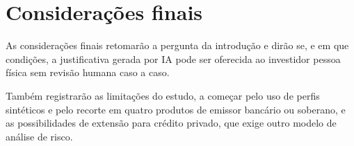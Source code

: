 
\section{Considerações finais}

As considerações finais retomarão a pergunta da introdução e dirão se, e em
que condições, a justificativa gerada por IA pode ser oferecida ao investidor
pessoa física sem revisão humana caso a caso.

Também registrarão as limitações do estudo, a começar pelo uso de perfis
sintéticos e pelo recorte em quatro produtos de emissor bancário ou soberano, e
as possibilidades de extensão para crédito privado, que exige outro modelo de
análise de risco.
